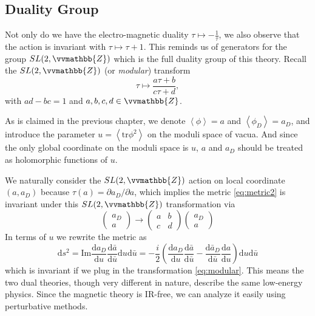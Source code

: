 \documentclass{article}
\begin{document}
\subsection{Duality Group}
Not only do we have the electro-magnetic duality $\tau\mapsto-\frac{1}{\tau}$, we also observe that the action is invariant with $\tau\mapsto\tau+1$. This reminds us of generators for the group $SL(2,\vvmathbb{Z})$ which is the full duality group of this theory. Recall the $SL(2,\vvmathbb{Z})$ (or \textit{modular}) transform
\begin{equation}
    \tau\mapsto\frac{a\tau+b}{c\tau+d},
\end{equation}
with $ad-bc=1$ and $a,b,c,d\in \vvmathbb{Z}$. 

As is claimed in the previous chapter, we denote $\left<\phi\right>=a$ and $\left<\phi_D\right>=a_D$, and introduce the parameter $u=\left<\mathrm{tr}\phi^2\right>$ on the moduli space of vacua. And since the only global coordinate on the moduli space is $u$, $a$ and $a_D$ should be treated as holomorphic functions of $u$. 

We naturally consider the $SL(2,\vvmathbb{Z})$ action on local coordinate $(a,a_D)$ because $\tau(a)=\partial a_D/\partial a$, which implies the metric \eqref{eq:metric2} is invariant under this $SL(2,\vvmathbb{Z})$ transformation via
\begin{equation}
\label{eq:modular}
\left(\begin{array}{c}
a_{D} \\
a
\end{array}\right) \rightarrow\left(\begin{array}{ll}
a & b \\
c & d
\end{array}\right)\left(\begin{array}{c}
a_{D} \\
a
\end{array}\right)
\end{equation}
In terms of $u$ we rewrite the metric as
\begin{equation}
\mathrm{d}s^{2}=\mathrm{Im} \frac{\mathrm{d} a_{D}}{\mathrm{d} u} \frac{\mathrm{d} \bar{a}}{\mathrm{d} \bar{u}} \mathrm{d} u \mathrm{d} \bar{u}=-\frac{i}{2}\left(\frac{\mathrm{d} a_{D}}{\mathrm{d} u} \frac{\mathrm{d} \bar{a}}{\mathrm{d} \bar{u}}-\frac{\mathrm{d} \bar{a}_{D}}{\mathrm{d} \bar{u}} \frac{\mathrm{d} a}{\mathrm{d} u}\right) \mathrm{d} u \mathrm{d} \bar{u}
\end{equation}
which is invariant if we plug in the transformation \eqref{eq:modular}. This means the two dual theories, though very different in nature, describe the same low-energy physics. Since the magnetic theory is IR-free, we can analyze it easily using perturbative methods.
\end{document}
